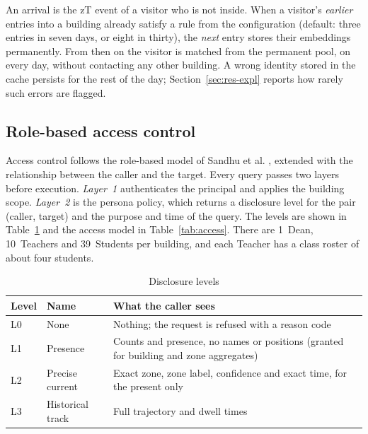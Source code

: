 \documentclass[12pt,a4paper,oneside]{report}
\begin{document}
An arrival is the zT event of a visitor who is not inside. When a visitor's \emph{earlier} entries into a building already satisfy a rule from the configuration (default: three entries in seven days, or eight in thirty), the \emph{next} entry stores their embeddings permanently. From then on the visitor is matched from the permanent pool, on every day, without contacting any other building. A wrong identity stored in the cache persists for the rest of the day; Section~\ref{sec:res-expl} reports how rarely such errors are flagged.

\subsection{Role-based access control}
Access control follows the role-based model of Sandhu et al. \cite{ref21}, extended with the relationship between the caller and the target. Every query passes two layers before execution. \emph{Layer~1} authenticates the principal and applies the building scope. \emph{Layer~2} is the persona policy, which returns a disclosure level for the pair (caller, target) and the purpose and time of the query. The levels are shown in Table~\ref{tab:levels} and the access model in Table~\ref{tab:access}. There are 1~Dean, 10~Teachers and 39~Students per building, and each Teacher has a class roster of about four students.

\begin{table}[htbp]
\centering
\caption{Disclosure levels}\label{tab:levels}
{\small\setlength{\tabcolsep}{4pt}\renewcommand{\arraystretch}{1.2}
\begin{tabular}{|p{1.17cm}|p{4.11cm}|p{9.00cm}|}\hline
\textbf{Level} & \textbf{Name} & \textbf{What the caller sees}\\\hline
L0 & None & Nothing; the request is refused with a reason code\\\hline
L1 & Presence & Counts and presence, no names or positions (granted for building and zone aggregates)\\\hline
L2 & Precise current & Exact zone, zone label, confidence and exact time, for the present only\\\hline
L3 & Historical track & Full trajectory and dwell times\\\hline
\end{tabular}}
\end{table}
\end{document}

